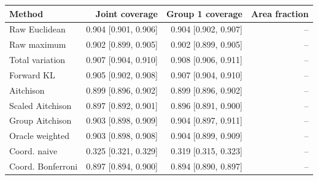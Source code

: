 \begin{tabular}{lrrr}
\toprule
Method & Joint coverage & Group 1 coverage & Area fraction \\
\midrule
Raw Euclidean & 0.904 [0.901, 0.906] & 0.904 [0.902, 0.907] & -- \\
Raw maximum & 0.902 [0.899, 0.905] & 0.902 [0.899, 0.905] & -- \\
Total variation & 0.907 [0.904, 0.910] & 0.908 [0.906, 0.911] & -- \\
Forward KL & 0.905 [0.902, 0.908] & 0.907 [0.904, 0.910] & -- \\
Aitchison & 0.899 [0.896, 0.902] & 0.899 [0.896, 0.902] & -- \\
Scaled Aitchison & 0.897 [0.892, 0.901] & 0.896 [0.891, 0.900] & -- \\
Group Aitchison & 0.903 [0.898, 0.909] & 0.904 [0.897, 0.911] & -- \\
Oracle weighted & 0.903 [0.898, 0.908] & 0.904 [0.899, 0.909] & -- \\
Coord. naive & 0.325 [0.321, 0.329] & 0.319 [0.315, 0.323] & -- \\
Coord. Bonferroni & 0.897 [0.894, 0.900] & 0.894 [0.890, 0.897] & -- \\
\bottomrule
\end{tabular}
